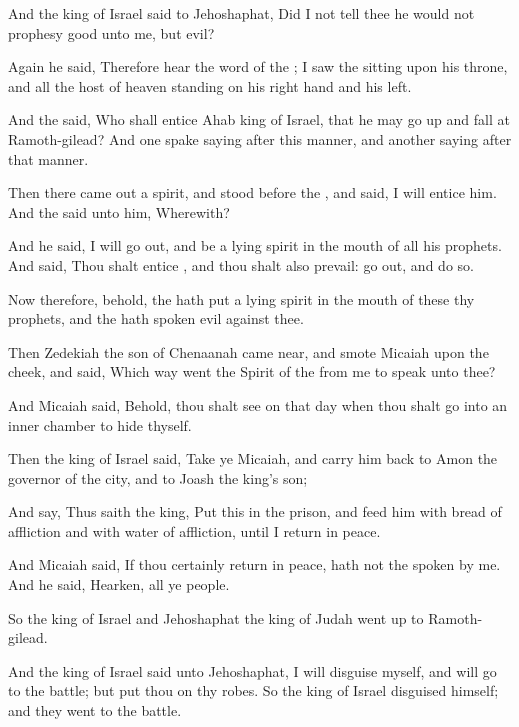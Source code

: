{And the
king of
Israel
said to
Jehoshaphat, Did I not
tell thee
{} he would not
prophesy
good unto me, but
evil?

Again he
said, Therefore
hear the
word of the
{}; I
saw the
{}
sitting upon his
throne, and all the
host of
heaven
standing on his right
hand and
{} his
left.

And the
{}
said, Who shall
entice
Ahab
king of
Israel, that he may go
up and
fall at
Ramoth-gilead? And one
spake
saying after this
manner, and another
saying after that
manner.

Then there came
out a
spirit, and
stood
before the
{}, and
said, I will
entice him. And the
{}
said unto him, Wherewith?

And he
said, I will go
out, and be a
lying
spirit in the
mouth of all his
prophets. And
{}
said, Thou shalt
entice
{}, and thou shalt also
prevail: go
out, and
do
{} so.

Now therefore, behold, the
{} hath
put a
lying
spirit in the
mouth of these thy
prophets, and the
{} hath
spoken
evil against thee.

Then
Zedekiah the
son of
Chenaanah came
near, and
smote
Micaiah upon the
cheek, and
said,
Which
way
went the
Spirit of the
{} from me to
speak unto thee?

And
Micaiah
said, Behold, thou shalt
see on that
day when thou shalt
go into an
inner
chamber to
hide thyself.

Then the
king of
Israel
said,
Take ye
Micaiah, and carry him
back to
Amon the
governor of the
city, and to
Joash the
king’s
son;

And
say, Thus
saith the
king,
Put this
{} in the
prison, and
feed him with
bread of
affliction and with
water of
affliction, until I
return in
peace.

And
Micaiah
said, If thou
certainly
return in
peace,
{} hath not the
{}
spoken by me. And he
said,
Hearken, all ye
people.


\par }{\PP {}So the
king of
Israel and
Jehoshaphat the
king of
Judah went
up to
Ramoth-gilead.

And the
king of
Israel
said unto
Jehoshaphat, I will
disguise myself, and will
go to the
battle; but
put thou on thy
robes. So the
king of
Israel
disguised himself; and they
went to the
battle.

}
